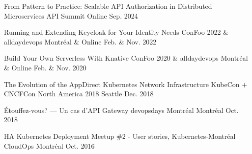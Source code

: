 \begin{cvhonors}

  \cvhonor
    {From Pattern to Practice: Scalable API Authorization in Distributed Microservices} %
    {API Summit} %
    {
    } %
    {Online} %
    {Sep. 2024} %

  \cvhonor
    {Running and Extending Keycloak for Your Identity Needs} %
    {ConFoo 2022 \& alldaydevops} %
    {} %
    {Montréal \& Online} %
    {Feb. \& Nov. 2022} %

  \cvhonor
    {Build Your Own Serverless With Knative} %
    {ConFoo 2020 \& alldaydevops} %
    {} %
    {Montréal \& Online} %
    {Feb. \& Nov. 2020} %



  \cvhonor
    {The Evolution of the AppDirect Kubernetes Network Infrastructure} %
    {KubeCon + CNCFCon North America 2018} %
    {} %
    {Seattle} %
    {Dec. 2018} %

  \cvhonor
    {Étouffez-vous? — Un cas d’API Gateway} %
    {devopsdays Montréal} %
    {} %
    {Montréal} %
    {Oct. 2018} %


  \cvhonor
    {HA Kubernetes Deployment} %
    {Meetup \#2 - User stories, Kubernetes-Montréal} %
    {} %
    {CloudOps Montréal} %
    {Oct. 2016} %

\end{cvhonors}
